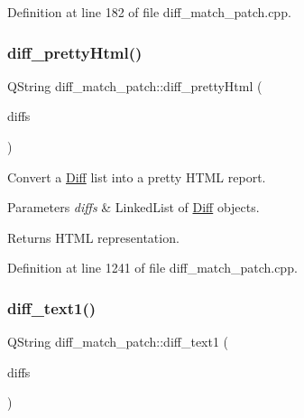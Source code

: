 Definition at line 182 of file diff\+\_\+match\+\_\+patch.\+cpp.

\mbox{\label{classdiff__match__patch_a3eeaf8a99e5d6f53e8994128d64f57f1}} 
\subsubsection{\texorpdfstring{diff\+\_\+pretty\+Html()}{diff\_prettyHtml()}}
{\footnotesize\ttfamily Q\+String diff\+\_\+match\+\_\+patch\+::diff\+\_\+pretty\+Html (\begin{DoxyParamCaption}\item[{const Q\+List$<$ \hyperlink{class_diff}{Diff} $>$ \&}]{diffs }\end{DoxyParamCaption})}

Convert a \hyperlink{class_diff}{Diff} list into a pretty H\+T\+ML report. 
\begin{DoxyParams}{Parameters}
{\em diffs} & Linked\+List of \hyperlink{class_diff}{Diff} objects. \\
\hline
\end{DoxyParams}
\begin{DoxyReturn}{Returns}
H\+T\+ML representation. 
\end{DoxyReturn}


Definition at line 1241 of file diff\+\_\+match\+\_\+patch.\+cpp.

\mbox{\label{classdiff__match__patch_a6a1995ece702b50091f3883518864ea7}} 
\subsubsection{\texorpdfstring{diff\+\_\+text1()}{diff\_text1()}}
{\footnotesize\ttfamily Q\+String diff\+\_\+match\+\_\+patch\+::diff\+\_\+text1 (\begin{DoxyParamCaption}\item[{const Q\+List$<$ \hyperlink{class_diff}{Diff} $>$ \&}]{diffs }\end{DoxyParamCaption})}

